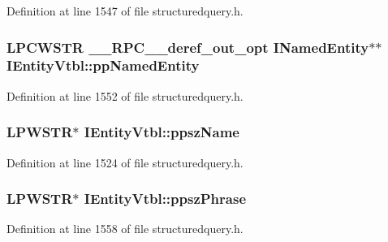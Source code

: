 Definition at line 1547 of file structuredquery.\+h.

\subsubsection[{\texorpdfstring{pp\+Named\+Entity}{ppNamedEntity}}]{ {\bf L\+P\+C\+W\+S\+TR} {\bf \+\_\+\+\_\+\+R\+P\+C\+\_\+\+\_\+deref\+\_\+out\+\_\+opt} {\bf I\+Named\+Entity}$\ast$$\ast$ I\+Entity\+Vtbl\+::pp\+Named\+Entity}\hypertarget{struct_i_entity_vtbl_a10a10f8cb4c08721d8324373ddcefd91}{}\label{struct_i_entity_vtbl_a10a10f8cb4c08721d8324373ddcefd91}


Definition at line 1552 of file structuredquery.\+h.

\subsubsection[{\texorpdfstring{ppsz\+Name}{ppszName}}]{ {\bf L\+P\+W\+S\+TR}$\ast$ I\+Entity\+Vtbl\+::ppsz\+Name}\hypertarget{struct_i_entity_vtbl_aff93fd576f7385df45b4ed44ecc5684a}{}\label{struct_i_entity_vtbl_aff93fd576f7385df45b4ed44ecc5684a}


Definition at line 1524 of file structuredquery.\+h.

\subsubsection[{\texorpdfstring{ppsz\+Phrase}{ppszPhrase}}]{ {\bf L\+P\+W\+S\+TR}$\ast$ I\+Entity\+Vtbl\+::ppsz\+Phrase}\hypertarget{struct_i_entity_vtbl_a5fe7f19486767bfa533a27ac3226aa86}{}\label{struct_i_entity_vtbl_a5fe7f19486767bfa533a27ac3226aa86}


Definition at line 1558 of file structuredquery.\+h.

